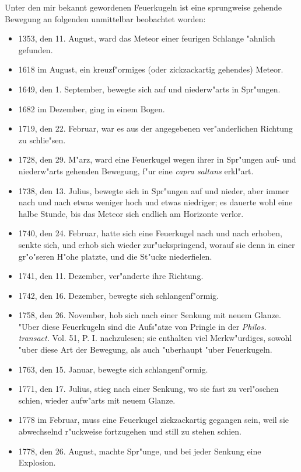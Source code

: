 \documentclass[a4paper, 11pt, oneside, polutonikogreek, german]{article}
\begin{document}
Unter den mir bekannt gewordenen Feuerkugeln ist eine sprungweise gehende Bewegung an folgenden unmittelbar beobachtet worden:
\begin{itemize}
    \item 1353, den 11. August, ward das Meteor einer feurigen Schlange "ahnlich gefunden.
    \item 1618 im August, ein kreuzf"ormiges (oder zickzackartig gehendes) Meteor.
    \item 1649, den 1. September, bewegte sich auf und niederw"arts in Spr"ungen.
    \item 1682 im Dezember, ging in einem Bogen.
    \item 1719, den 22. Februar, war es aus der angegebenen ver"anderlichen Richtung zu schlie"sen.
    \item 1728, den 29. M"arz, ward eine Feuerkugel wegen ihrer in Spr"ungen auf- und niederw"arts gehenden Bewegung, f"ur eine \emph{capra saltans} erkl"art.
    \item 1738, den 13. Julius, bewegte sich in Spr"ungen auf und nieder, aber immer nach und nach etwas weniger hoch und etwas niedriger; es dauerte wohl eine halbe Stunde, bis das Meteor sich endlich am Horizonte verlor.
    \item 1740, den 24. Februar, hatte sich eine Feuerkugel nach und nach erhoben, senkte sich, und erhob sich wieder zur"uckspringend, worauf sie denn in einer gr"o"seren H"ohe platzte, und die St"ucke niederfielen.
    \item 1741, den 11. Dezember, ver"anderte ihre Richtung.
    \item 1742, den 16. Dezember, bewegte sich schlangenf"ormig.
    \item 1758, den 26. November, hob sich nach einer Senkung mit neuem Glanze. "Uber diese Feuerkugeln sind die Aufs"atze von Pringle in der \emph{Philos. transact.} Vol. 51, P. I. nachzulesen; sie enthalten viel Merkw"urdiges, sowohl "uber diese Art der Bewegung, als auch "uberhaupt "uber Feuerkugeln.
    \item 1763, den 15. Januar, bewegte sich schlangenf"ormig.
    \item 1771, den 17. Julius, stieg nach einer Senkung, wo sie fast zu verl"oschen schien, wieder aufw"arts mit neuem Glanze.
    \item 1778 im Februar, muss eine Feuerkugel zickzackartig gegangen sein, weil sie abwechselnd r"uckweise fortzugehen und still zu stehen schien.
    \item 1778, den 26. August, machte Spr"unge, und bei jeder Senkung eine Explosion.

\end{itemize}
\end{document}
